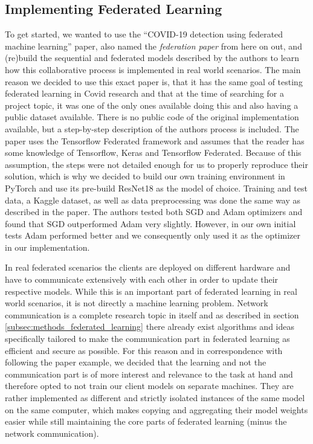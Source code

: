 \subsection{Implementing Federated Learning}\label{subsec:methods_original_paper}
To get started, we wanted to use the \enquote{COVID-19 detection using federated machine learning} paper\cite{federated_machine_learning}, also named the \textit{federation paper} from here on out, and (re)build the sequential and federated models described by the authors to learn how this collaborative process is implemented in real world scenarios. The main reason we decided to use this exact paper is, that it has the same goal of testing federated learning in Covid research and that at the time of searching for a project topic, it was one of the only ones available doing this and also having a public dataset available.
There is no public code of the original implementation available, but a step-by-step description of the authors process is included. The paper uses the Tensorflow Federated framework\cite{tensorflow_federated} and assumes that the reader has some knowledge of Tensorflow, Keras and Tensorflow Federated. Because of this assumption, the steps were not detailed enough for us to properly reproduce their solution, which is why we decided to build our own training environment in PyTorch and use its pre-build ResNet18 as the model of choice. Training and test data, a Kaggle dataset\cite{}, as well as data preprocessing was done the same way as described in the paper. The authors tested both SGD and Adam optimizers and found that SGD outperformed Adam very slightly. However, in our own initial tests Adam performed better and we consequently only used it as the optimizer in our implementation.

In real federated scenarios the clients are deployed on different hardware and have to communicate extensively with each other in order to update their respective models. While this is an important part of federated learning in real world scenarios, it is not directly a machine learning problem. Network communication is a complete research topic in itself and as described in section \ref{subsec:methods_federated_learning} there already exist algorithms and ideas specifically tailored to make the communication part in federated learning as efficient and secure as possible. For this reason and in correspondence with following the paper example, we decided that the learning and not the communication part is of more interest and relevance to the task at hand and therefore opted to not train our client models on separate machines. They are rather implemented as different and strictly isolated instances of the same model on the same computer, which makes copying and aggregating their model weights easier while still maintaining the core parts of federated learning (minus the network communication).

